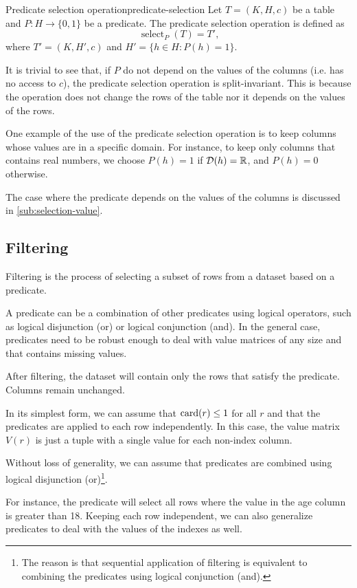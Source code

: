 \begin{defbox}{Predicate selection operation}{predicate-selection}
  Let $T = (K, H, c)$ be a table and $P : H \to \{0, 1\}$ be a predicate.  The predicate
  selection operation is defined as \[
    \operatorname{select}_{P}(T) = T'\text{,}
  \] where $T' = (K, H', c)$ and $H' = \{h \in H : P(h) = 1\}$.
\end{defbox}

It is trivial to see that, if $P$ do not depend on the values of the columns (i.e. has no
access to $c$), the predicate selection operation is split-invariant.  This is because the
operation does not change the rows of the table nor it depends on the values of the rows.

One example of the use of the predicate selection operation is to keep columns whose
values are in a specific domain.  For instance, to keep only columns that contains real
numbers, we choose $P(h) = 1$ if $\domainof{h} = \mathbb{R}$, and $P(h) = 0$ otherwise.

The case where the predicate depends on the values of the columns is discussed in
\cref{sub:selection-value}.

\subsection{Filtering}

Filtering is the process of selecting a subset of rows from a dataset based on a
predicate.

A predicate can be a combination of other predicates using logical operators, such as
logical disjunction (or) or logical conjunction (and).  In the general case, predicates
need to be robust enough to deal with value matrices of any size and that contains missing
values.

After filtering, the dataset will contain only the rows that satisfy the predicate.
Columns remain unchanged.

In its simplest form, we can assume that $\rowcard[r] \leq 1$ for all $r$ and that the
predicates are applied to each row independently.  In this case, the value matrix $V(r)$
is just a tuple with a single value for each non-index column.

Without loss of generality, we can assume that predicates are combined using logical
disjunction (or)\footnote{The reason is that sequential application of filtering is
equivalent to combining the predicates using logical conjunction (and).}.

For instance, the predicate  will select all rows where the value in the
age column is greater than 18.  Keeping each row independent, we can also generalize
predicates to deal with the values of the indexes as well.

